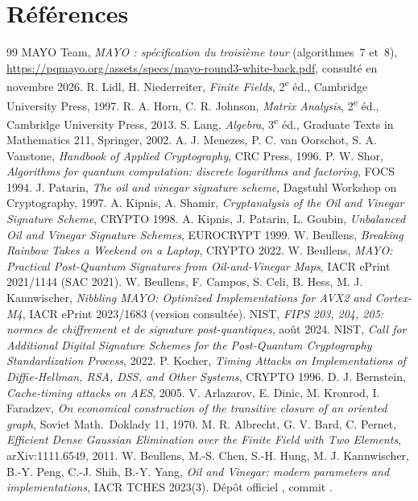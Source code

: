 \chapter*{Références}
\makeatletter\begingroup\let\chapter\@gobble\def\bibname{}
\begin{thebibliography}{99}
 MAYO Team, \emph{MAYO : spécification du troisième tour} (algorithmes~7 et~8), \url{https://pqmayo.org/assets/specs/mayo-round3-white-back.pdf}, consulté en novembre 2026.
 R. Lidl, H. Niederreiter, \emph{Finite Fields}, 2\textsuperscript{e} éd., Cambridge University Press, 1997.
 R. A. Horn, C. R. Johnson, \emph{Matrix Analysis}, 2\textsuperscript{e} éd., Cambridge University Press, 2013.
 S. Lang, \emph{Algebra}, 3\textsuperscript{e} éd., Graduate Texts in Mathematics 211, Springer, 2002.
 A. J. Menezes, P. C. van Oorschot, S. A. Vanstone, \emph{Handbook of Applied Cryptography}, CRC Press, 1996.
 P. W. Shor, \emph{Algorithms for quantum computation: discrete logarithms and factoring}, FOCS 1994.
 J. Patarin, \emph{The oil and vinegar signature scheme}, Dagstuhl Workshop on Cryptography, 1997.
 A. Kipnis, A. Shamir, \emph{Cryptanalysis of the Oil and Vinegar Signature Scheme}, CRYPTO 1998.
 A. Kipnis, J. Patarin, L. Goubin, \emph{Unbalanced Oil and Vinegar Signature Schemes}, EUROCRYPT 1999.
 W. Beullens, \emph{Breaking Rainbow Takes a Weekend on a Laptop}, CRYPTO 2022.
 W. Beullens, \emph{MAYO: Practical Post-Quantum Signatures from Oil-and-Vinegar Maps}, IACR ePrint 2021/1144 (SAC 2021).
 W. Beullens, F. Campos, S. Celi, B. Hess, M. J. Kannwischer, \emph{Nibbling MAYO: Optimized Implementations for AVX2 and Cortex-M4}, IACR ePrint 2023/1683 (version consultée).
 NIST, \emph{FIPS 203, 204, 205: normes de chiffrement et de signature post-quantiques}, août 2024.
 NIST, \emph{Call for Additional Digital Signature Schemes for the Post-Quantum Cryptography Standardization Process}, 2022.
 P. Kocher, \emph{Timing Attacks on Implementations of Diffie-Hellman, RSA, DSS, and Other Systems}, CRYPTO 1996.
 D. J. Bernstein, \emph{Cache-timing attacks on AES}, 2005.
 V. Arlazarov, E. Dinic, M. Kronrod, I. Faradzev, \emph{On economical construction of the transitive closure of an oriented graph}, Soviet Math.\ Doklady 11, 1970.
 M. R. Albrecht, G. V. Bard, C. Pernet, \emph{Efficient Dense Gaussian Elimination over the Finite Field with Two Elements}, arXiv:1111.6549, 2011.
 W. Beullens, M.-S. Chen, S.-H. Hung, M. J. Kannwischer, B.-Y. Peng, C.-J. Shih, B.-Y. Yang, \emph{Oil and Vinegar: modern parameters and implementations}, IACR TCHES 2023(3).
 Dépôt officiel , commit .
\end{thebibliography}\endgroup\makeatother
